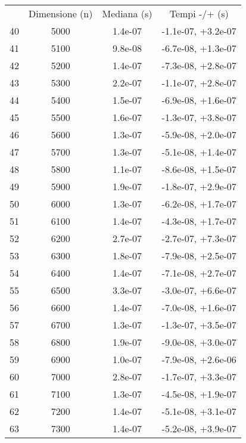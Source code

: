 \begin{table}
\centering
\begin{adjustbox}{width=1\textwidth/2}
\begin{tabular}{|c|c|c|c|}
\hline
 & Dimensione (n) & Mediana (s) & Tempi -/+ (s) \\
40 & 5000 & 1.4e-07 & -1.1e-07, +3.2e-07 \\
\cline{1-4}
41 & 5100 & 9.8e-08 & -6.7e-08, +1.3e-07 \\
\cline{1-4}
42 & 5200 & 1.4e-07 & -7.3e-08, +2.8e-07 \\
\cline{1-4}
43 & 5300 & 2.2e-07 & -1.1e-07, +2.8e-07 \\
\cline{1-4}
44 & 5400 & 1.5e-07 & -6.9e-08, +1.6e-07 \\
\cline{1-4}
45 & 5500 & 1.6e-07 & -1.3e-07, +3.8e-07 \\
\cline{1-4}
46 & 5600 & 1.3e-07 & -5.9e-08, +2.0e-07 \\
\cline{1-4}
47 & 5700 & 1.3e-07 & -5.1e-08, +1.4e-07 \\
\cline{1-4}
48 & 5800 & 1.1e-07 & -8.6e-08, +1.5e-07 \\
\cline{1-4}
49 & 5900 & 1.9e-07 & -1.8e-07, +2.9e-07 \\
\cline{1-4}
50 & 6000 & 1.3e-07 & -6.2e-08, +1.7e-07 \\
\cline{1-4}
51 & 6100 & 1.4e-07 & -4.3e-08, +1.7e-07 \\
\cline{1-4}
52 & 6200 & 2.7e-07 & -2.7e-07, +7.3e-07 \\
\cline{1-4}
53 & 6300 & 1.8e-07 & -7.9e-08, +2.5e-07 \\
\cline{1-4}
54 & 6400 & 1.4e-07 & -7.1e-08, +2.7e-07 \\
\cline{1-4}
55 & 6500 & 3.3e-07 & -3.0e-07, +6.6e-07 \\
\cline{1-4}
56 & 6600 & 1.4e-07 & -7.0e-08, +1.6e-07 \\
\cline{1-4}
57 & 6700 & 1.3e-07 & -1.3e-07, +3.5e-07 \\
\cline{1-4}
58 & 6800 & 1.9e-07 & -9.0e-08, +3.0e-07 \\
\cline{1-4}
59 & 6900 & 1.0e-07 & -7.9e-08, +2.6e-06 \\
\cline{1-4}
60 & 7000 & 2.8e-07 & -1.7e-07, +3.3e-07 \\
\cline{1-4}
61 & 7100 & 1.3e-07 & -4.5e-08, +1.9e-07 \\
\cline{1-4}
62 & 7200 & 1.4e-07 & -5.1e-08, +3.1e-07 \\
\cline{1-4}
63 & 7300 & 1.4e-07 & -5.2e-08, +3.9e-07 \\

\end{tabular}
\end{adjustbox}
\end{table}
